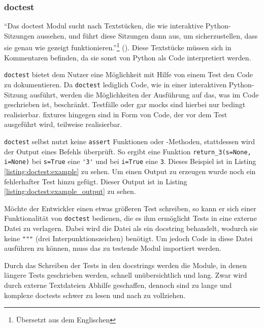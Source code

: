 \subsubsection{doctest}\label{python-tools:doctest}

"`Das doctest Modul sucht nach Textstücken, die wie interaktive Python-Sitzungen
aussehen, und führt diese Sitzungen dann aus, um sicherzustellen, dass sie genau
wie gezeigt funktionieren."'\footnote{Übersetzt aus dem Englischen}
(\cite{docs.python:doctest}). Diese Textstücke müssen sich in Kommentaren
befinden, da sie sonst von Python als Code interpretiert werden.

\lstinline{doctest} bietet dem Nutzer eine Möglichkeit mit Hilfe von einem Test
den Code zu dokumentieren. Da \lstinline{doctest} lediglich Code, wie in einer
interaktiven Python-Sitzung ausführt, werden die Möglichkeiten der Ausführung
auf das, was im Code geschrieben ist, beschränkt. Testfälle oder gar
\Glspl{mock} sind hierbei nur bedingt realisierbar. \Glspl{fixture} hingegen
sind in Form von Code, der vor dem Test ausgeführt wird, teilweise realisierbar.

\lstinline{doctest} selbst nutzt keine \lstinline{assert} Funktionen oder
-Methoden, stattdessen wird der Output eines Befehls überprüft. So ergibt eine
Funktion \lstinline{return_3(s=None, i=None)} bei \lstinline{s=True} eine
\lstinline{'3'} und bei \lstinline{i=True} eine \lstinline{3}. Dieses Beispiel 
ist in Listing \ref{listing:doctest:example} zu sehen. Um einen Output zu 
erzeugen wurde noch ein fehlerhafter Test hinzu gefügt. Dieser Output ist in 
Listing \ref{listing:doctest:example_output} zu sehen.

Möchte der Entwickler einen etwas größeren Test schreiben, so kann er sich einer
Funktionalität von \lstinline{doctest} bedienen, die es ihm ermöglicht Tests in
eine externe Datei zu verlagern. Dabei wird die Datei als ein \Gls{docstring}
behandelt, wodurch sie keine \lstinline{"""} (drei Interpunktionszeichen) 
benötigt. Um jedoch Code in diese Datei ausführen zu können, muss das zu 
testende Modul importiert werden.

Durch das Schreiben der Tests in den \Glspl{docstring} werden die Module, in
denen längere Tests geschrieben werden, schnell unübersichtlich und lang.
Zwar wird durch externe Textdateien Abhilfe geschaffen, dennoch sind zu lange 
und komplexe doctests schwer zu lesen und nach zu vollziehen.
\newline

